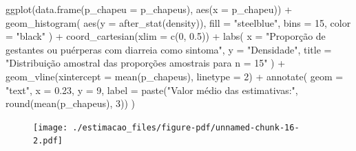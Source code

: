 \documentclass[
  letterpaper,
  DIV=11,
  numbers=noendperiod]{scrreprt}
\newenvironment{Shaded}{\begin{snugshade}}{\end{snugshade}}
\newcommand{\AttributeTok}[1]{\textcolor[rgb]{0.40,0.45,0.13}{#1}}
\newcommand{\DecValTok}[1]{\textcolor[rgb]{0.68,0.00,0.00}{#1}}
\newcommand{\FloatTok}[1]{\textcolor[rgb]{0.68,0.00,0.00}{#1}}
\newcommand{\FunctionTok}[1]{\textcolor[rgb]{0.28,0.35,0.67}{#1}}
\newcommand{\NormalTok}[1]{\textcolor[rgb]{0.00,0.23,0.31}{#1}}
\newcommand{\SpecialCharTok}[1]{\textcolor[rgb]{0.37,0.37,0.37}{#1}}
\newcommand{\StringTok}[1]{\textcolor[rgb]{0.13,0.47,0.30}{#1}}
\begin{document}
\begin{Shaded}
\begin{Highlighting}[]
\FunctionTok{ggplot}\NormalTok{(}\FunctionTok{data.frame}\NormalTok{(}\AttributeTok{p\_chapeu =}\NormalTok{ p\_chapeus), }\FunctionTok{aes}\NormalTok{(}\AttributeTok{x =}\NormalTok{ p\_chapeu))  }\SpecialCharTok{+} 
  \FunctionTok{geom\_histogram}\NormalTok{(}
    \FunctionTok{aes}\NormalTok{(}\AttributeTok{y =} \FunctionTok{after\_stat}\NormalTok{(density)),}
    \AttributeTok{fill =} \StringTok{"steelblue"}\NormalTok{, }
    \AttributeTok{bins =} \DecValTok{15}\NormalTok{, }
    \AttributeTok{color =} \StringTok{"black"}
\NormalTok{    ) }\SpecialCharTok{+}
  \FunctionTok{coord\_cartesian}\NormalTok{(}\AttributeTok{xlim =} \FunctionTok{c}\NormalTok{(}\DecValTok{0}\NormalTok{, }\FloatTok{0.5}\NormalTok{)) }\SpecialCharTok{+}
  \FunctionTok{labs}\NormalTok{(}
    \AttributeTok{x =} \StringTok{"Proporção de gestantes ou puérperas com diarreia como sintoma"}\NormalTok{, }
    \AttributeTok{y =} \StringTok{"Densidade"}\NormalTok{,}
    \AttributeTok{title =} \StringTok{"Distribuição amostral das proporções amostrais para n = 15"}
\NormalTok{    ) }\SpecialCharTok{+} 
  \FunctionTok{geom\_vline}\NormalTok{(}\AttributeTok{xintercept =} \FunctionTok{mean}\NormalTok{(p\_chapeus), }\AttributeTok{linetype =} \DecValTok{2}\NormalTok{) }\SpecialCharTok{+}
  \FunctionTok{annotate}\NormalTok{(}
    \AttributeTok{geom =} \StringTok{"text"}\NormalTok{,}
    \AttributeTok{x =} \FloatTok{0.23}\NormalTok{, }
    \AttributeTok{y =} \DecValTok{9}\NormalTok{,}
    \AttributeTok{label =} \FunctionTok{paste}\NormalTok{(}\StringTok{"Valor médio das estimativas:"}\NormalTok{, }\FunctionTok{round}\NormalTok{(}\FunctionTok{mean}\NormalTok{(p\_chapeus), }\DecValTok{3}\NormalTok{))}
\NormalTok{    )}
\end{Highlighting}
\end{Shaded}

\begin{figure}[H]

{\centering \texttt{[image: ./estimacao\_files/figure-pdf/unnamed-chunk-16-2.pdf]}

}

\end{figure}
\end{document}

